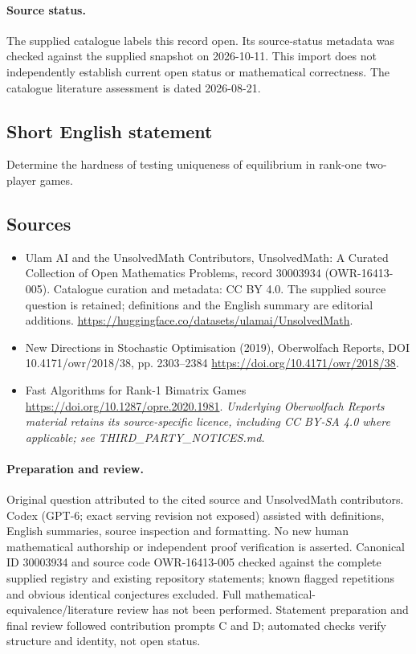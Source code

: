 \documentclass[11pt]{article}
\begin{document}
\paragraph{Source status.}
The supplied catalogue labels this record open. Its source-status metadata was checked against the supplied snapshot on 2026-10-11. This import does not independently establish current open status or mathematical correctness. The catalogue literature assessment is dated 2026-08-21.
\subsection{Short English statement}
Determine the hardness of testing uniqueness of equilibrium in rank-one two-player games.
\subsection{Sources}
\begin{itemize}
\item[S1] Ulam AI and the UnsolvedMath Contributors, UnsolvedMath: A Curated Collection of Open Mathematics Problems, record 30003934 (OWR-16413-005). Catalogue curation and metadata: CC BY 4.0. The supplied source question is retained; definitions and the English summary are editorial additions.
\url{https://huggingface.co/datasets/ulamai/UnsolvedMath}.
\item[S2] New Directions in Stochastic Optimisation (2019), Oberwolfach Reports, DOI 10.4171/owr/2018/38, pp. 2303--2384
\url{https://doi.org/10.4171/owr/2018/38}.
\item[S3] Fast Algorithms for Rank-1 Bimatrix Games
\url{https://doi.org/10.1287/opre.2020.1981}.
\textit{Underlying Oberwolfach Reports material retains its source-specific licence, including CC BY-SA 4.0 where applicable; see THIRD\_PARTY\_NOTICES.md.}
\end{itemize}
\paragraph{Preparation and review.}
Original question attributed to the cited source and UnsolvedMath contributors. Codex (GPT-6; exact serving revision not exposed) assisted with definitions, English summaries, source inspection and formatting. No new human mathematical authorship or independent proof verification is asserted. Canonical ID 30003934 and source code OWR-16413-005 checked against the complete supplied registry and existing repository statements; known flagged repetitions and obvious identical conjectures excluded. Full mathematical-equivalence/literature review has not been performed. Statement preparation and final review followed contribution prompts C and D; automated checks verify structure and identity, not open status.
\label{end:30003934}
\end{document}

